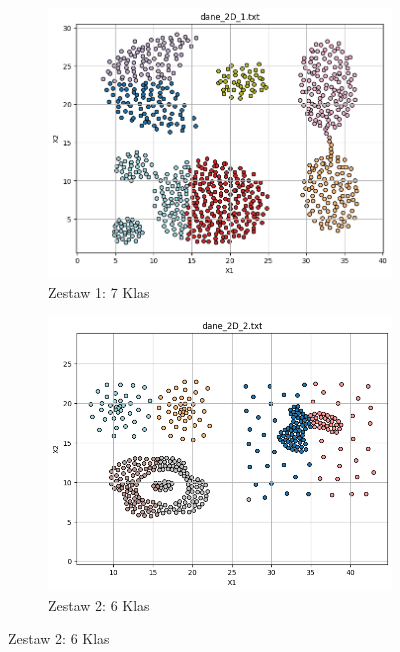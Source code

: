 \documentclass[polish,12pt,a4paper]{extarticle}
\begin{document}
\begin{figure}[h!]
    \centering

    \begin{subfigure}[b]{0.30\textwidth}
        \includegraphics[width=\linewidth]{img/kmeans2D/data1.png}
        \captionsetup{labelformat=empty}
        \caption{Zestaw 1: 7 Klas}
    \end{subfigure}
    \hfill
    \begin{subfigure}[b]{0.30\textwidth}
        \includegraphics[width=\linewidth]{img/kmeans2D/data2.png}
        \captionsetup{labelformat=empty}
        \caption{Zestaw 2: 6 Klas}
    \end{subfigure}

\end{figure}
\end{document}
